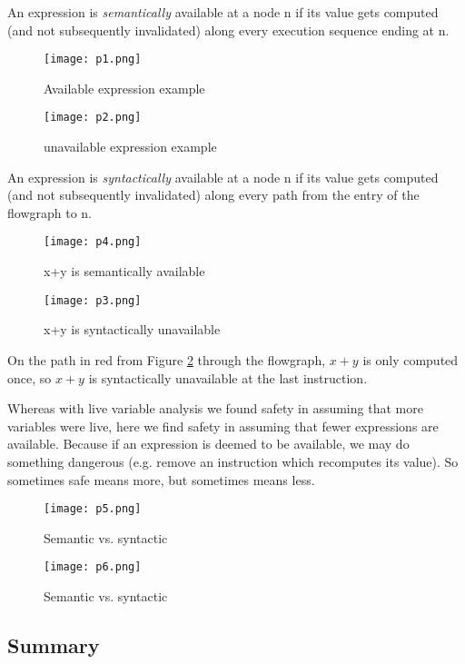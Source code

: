 An expression is \textit{semantically} available at a node n if its value gets computed
(and not subsequently invalidated) along every execution sequence ending at n.

\begin{figure}[!htb]
	\texttt{[image: p1.png]}
	\caption{Available expression example}\label{fig:p1}
	\endminipage\hfill
	\texttt{[image: p2.png]}
	\caption{unavailable expression example}\label{fig:p2}
	\endminipage
\end{figure}


An expression is \textit{syntactically} available at a node n if its value gets computed
(and not subsequently invalidated) along every path from the entry of the flowgraph to n.


\begin{figure}[!htb]
	\texttt{[image: p4.png]}
	\caption{x+y is semantically available}\label{fig:p4}
	\endminipage\hfill
	\texttt{[image: p3.png]}
	\caption{x+y is syntactically unavailable}\label{fig:p3}
	\endminipage
\end{figure}


On the path in red from Figure \ref{fig:p3} through the flowgraph, \(x+y\) is only
computed once, so \(x+y\) is syntactically unavailable at the last instruction.


Whereas with live variable analysis we found safety in assuming that
more variables were live, here we find safety in assuming that fewer
expressions are available. Because if an expression is deemed to be available, we
may do something dangerous (e.g. remove an instruction which recomputes its value).
So sometimes safe means more, but sometimes means less.

\begin{figure}[H]
	\texttt{[image: p5.png]}
	\caption{Semantic vs. syntactic}\label{fig:p5}
	\endminipage\hfill
	\texttt{[image: p6.png]}
	\caption{Semantic vs. syntactic}\label{fig:p6}
	\endminipage
\end{figure}


\subsection{Summary}



